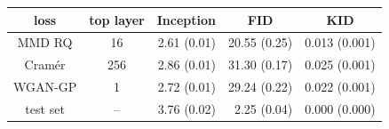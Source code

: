 \documentclass[xcolor={table}]{beamer}
\begin{document}
\begin{frame}{}
\begin{columns}[T, totalwidth=\textwidth]
\begin{column}{.32\textwidth}
\begin{table}
      \begin{tabular}{cc|rrr}
        loss & top layer & \multicolumn{1}{c}{Inception} & \multicolumn{1}{c}{FID} & \multicolumn{1}{c}{KID} \\
        \hline
        MMD RQ   &   16 &    2.61  (0.01) &   20.55  (0.25) &   0.013  (0.001)\\
        Cram\'er &  256 &    2.86  (0.01) &   31.30  (0.17) &   0.025  (0.001)\\
        WGAN-GP  & 1    &    2.72  (0.01) &   29.24  (0.22) &   0.022  (0.001)\\
        test set & --   &    3.76  (0.02) &    2.25  (0.04) &   0.000  (0.000)\\
    \end{tabular}
\end{table}
  \end{column}


\end{columns}
\end{frame}
\end{document}
